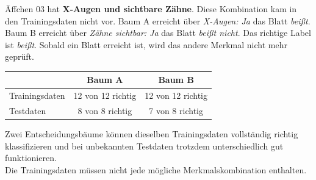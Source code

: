 \documentclass[11pt,a4paper]{article}
\newcommand{\fach}[1]{\textbf{\color{navy}#1}}
\begin{document}
\begin{beispiel}[title=Beispiel: Äffchen 03]
Äffchen 03 hat \fach{X-Augen und sichtbare Zähne}. Diese Kombination kam in den Trainingsdaten nicht vor.
Baum A erreicht über \emph{X-Augen: Ja} das Blatt \emph{beißt}. Baum B erreicht über
\emph{Zähne sichtbar: Ja} das Blatt \emph{beißt nicht}. Das richtige Label ist \emph{beißt}.
Sobald ein Blatt erreicht ist, wird das andere Merkmal nicht mehr geprüft.
\end{beispiel}

\begin{center}
\begin{tabular}{lcc}
\toprule
 & \textbf{Baum A} & \textbf{Baum B}\\
\midrule
Trainingsdaten & 12 von 12 richtig & 12 von 12 richtig\\
Testdaten & 8 von 8 richtig & 7 von 8 richtig\\
\bottomrule
\end{tabular}
\end{center}

\begin{merke}
Zwei Entscheidungsbäume können dieselben Trainingsdaten vollständig richtig klassifizieren und bei
unbekannten Testdaten trotzdem unterschiedlich gut funktionieren.\\
Die Trainingsdaten müssen nicht jede mögliche Merkmalskombination enthalten.
\end{merke}
\end{document}
